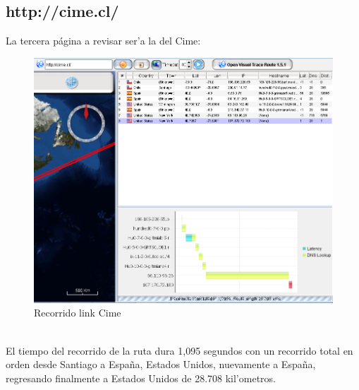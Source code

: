 \documentclass{article}
\begin{document}
\subsection{http://cime.cl/}
La tercera página a revisar ser'a la del Cime:
\\
\begin{figure}[H]
  \centering
    \includegraphics[width=1.0\textwidth]{ruta1_cime}
  \caption{Recorrido link Cime}
  \label{cime}
\end{figure}\\

El tiempo del recorrido de la ruta dura 1,095 segundos con un recorrido total en orden desde Santiago a España, Estados Unidos, nuevamente a España, regresando finalmente a Estados Unidos de 28.708 kil'ometros.
\end{document}
